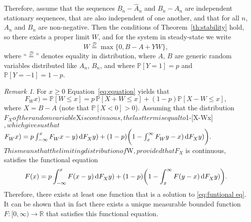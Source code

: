 \documentclass[reqno, 11pt, a4paper]{article}
\theoremstyle{plain}
\theoremstyle{remark}
\newtheorem{remark}{Remark}
\numberwithin{equation}{section}
\begin{document}
Therefore, assume that the sequences $\widehat{B}_n-\widehat{A}_n$ and $B_n-A_n$ are independent stationary sequences, that are also independent of one another, and that for all $n$, $A_n$ and $B_n$ are non-negative. Then the conditions of Theorem~\ref{th:stability} hold, so there exists a proper limit $W$, and for the system in steady-state we write
\begin{equation}\label{eq:equation}
W\stackrel{{\mathcal{{D}}}}{=}\max\{0, B-A+YW\},
\end{equation}
where ``$\stackrel{{\mathcal{{D}}}}{=}$'' denotes equality in distribution, where $A$, $B$ are generic random variables distributed like $A_n$, $B_n$, and where ${\mathbb{P}}[Y=1]=p$ and ${\mathbb{P}}[Y=-1]=1-p$.

\begin{remark}
For $x\geqslant 0$ Equation~\eqref{eq:equation} yields that
$$
{\mbox{$F_W^{}$}}x)={\mathbb{P}}[W\leqslant x]=p\, {\mathbb{P}}[X+W\leqslant x]+(1-p) {\mathbb{P}}[X-W\leqslant x],
$$
where $X=B-A$ (note that ${\mathbb{P}}[X<0]>0$). Assuming that the distribution ${\mbox{$F_X^{}$}} of the random variable $X$ is continuous, the last term is equal to $1-{}[X-W\geqslant x]$, which gives us that
$$
{\mbox{$F_W^{}$}}x)=p \int^x_{-\infty}{\mbox{$F_W^{}$}}x-y)\,{\rm d}{\mbox{$F_X^{}$}}y)+(1-p)\biggl(1-\int_x^\infty{\mbox{$F_W^{}$}}y-x)\,{\rm d}{\mbox{$F_X^{}$}}y)\biggr).
$$
This means that the limiting distribution of $W$, provided that ${\mbox{$F_X^{}$}} is continuous, satisfies the functional equation
\begin{equation}\label{eq:funtional eq}
F(x)=p \int^x_{-\infty} F(x-y)\,{\rm d}{\mbox{$F_X^{}$}}y)+(1-p)\biggl(1-\int_x^\infty F(y-x)\,{\rm d}{\mbox{$F_X^{}$}}y)\biggr).
\end{equation}
Therefore, there exists at least one function that is a solution to \eqref{eq:funtional eq}. It can be shown that in fact there exists a unique measurable bounded function $F: [0,\infty) \to \mathds{R}$ that satisfies this functional equation.


\end{remark}
\end{document}
